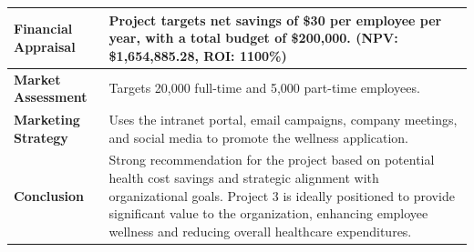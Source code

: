 \begin{longtable}{|p{}|p{}|}
    \hline
    \textbf{Financial Appraisal} & 
        Project targets net savings of \$30 per employee per year, with a total budget of \$200,000. (NPV: \$1,654,885.28, ROI: 1100\%) \\
    \hline
    \textbf{Market Assessment} & 
        Targets 20,000 full-time and 5,000 part-time employees. \\
    \hline
    \textbf{Marketing Strategy} & 
        Uses the intranet portal, email campaigns, company meetings, and social media to promote the wellness application. \\
    \hline
    \textbf{Conclusion} & 
        Strong recommendation for the project based on potential health cost savings and strategic alignment with organizational goals. Project 3 is ideally positioned to provide significant value to the organization, enhancing employee wellness and reducing overall healthcare expenditures. \\
\end{longtable}